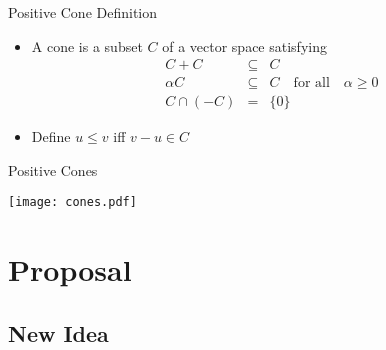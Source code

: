 \documentclass{beamer}
\newlength{\wideitemsep}
\let\olditem\item
\renewcommand{\item}{\setlength{\itemsep}{\wideitemsep}\olditem}
\begin{document}
\begin{frame}{Positive Cone Definition}
\begin{itemize}
\item A \alert{cone} is a subset $C$ of a vector space satisfying
\begin{eqnarray*}
C + C &\subseteq& C\\
\alpha C &\subseteq& C \quad \text{for all} \quad \alpha \ge 0\\
C \cap (-C) &=& \{0\}
\end{eqnarray*}
\item Define $u \le v$ iff $v - u \in C$
\end{itemize}
\end{frame}


\begin{frame}{Positive Cones}
\begin{center}
\texttt{[image: cones.pdf]}
\end{center}
\end{frame}


\section{Proposal}

\subsection{New Idea}
\end{document}
